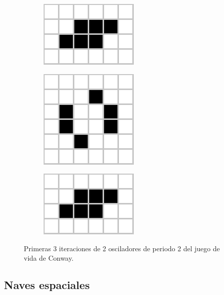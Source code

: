 \documentclass[../proyecto.tex]{memoir}
\begin{document}
\begin{figure}[H]
\begin{subfigure}[b]{0.3\linewidth}
        \includegraphics[height=0.35\linewidth]{./images/toad1.png}
        \caption{}
        \label{fig:toad1}
    \end{subfigure}
	\begin{subfigure}[b]{0.3\linewidth} 
        \centering
        \includegraphics[height=0.45\linewidth]{./images/toad2.png}
        \caption{}
        \label{fig:toad2}
    \end{subfigure}
	\begin{subfigure}[b]{0.3\linewidth} 
        \centering
        \includegraphics[height=0.35\linewidth]{./images/toad3.png}
        \caption{}
        \label{fig:toad3}
    \end{subfigure}
	\caption{Primeras 3 iteraciones de 2 osciladores de periodo 2 del juego de vida de Conway.}
	\label{fig:congIniciales3}
\end{figure} 

\subsection{Naves espaciales} \label{spaceships}
\end{document}
